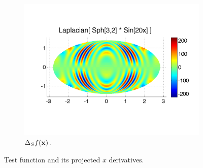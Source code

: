 \begin{figure}[htbp]
	\begin{subfigure}[b]{0.425\textwidth}
	\includegraphics[width=1.0\textwidth]{figures/chapter2/compare_weight_generation/lsfc_vs_px_grad_dot_px_grad/lsfc_sph32_times_sin20x.pdf}
	\caption{$\Delta_S f(\mathbf{x})$.  }
	\end{subfigure}
	\caption{Test function and its projected $x$ derivatives. }
\end{figure}


